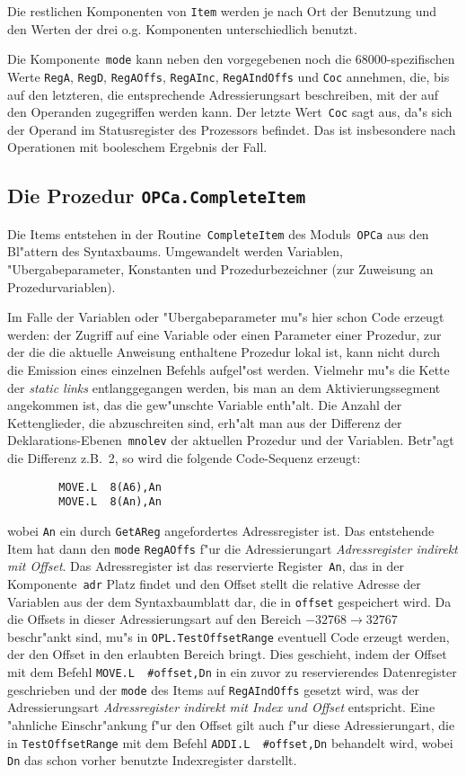 Die restlichen Komponenten von {\tt Item} werden je nach Ort der Benutzung
und den Werten der drei o.g. Komponenten unterschiedlich benutzt.

Die Komponente~{\tt mode} kann neben den vorgegebenen noch die
68000-spezifischen Werte {\tt RegA}, {\tt RegD}, {\tt RegAOffs}, {\tt RegAInc},
{\tt RegAIndOffs} und {\tt Coc} annehmen, die, bis auf den letzteren, die
entsprechende Adressierungsart beschreiben, mit der auf den Operanden
zugegriffen werden kann.
Der letzte Wert~{\tt Coc} sagt aus, da"s sich der Operand im Statusregister
des Prozessors befindet.
Das ist insbesondere nach Operationen mit booleschem Ergebnis der Fall.

\subsection{Die Prozedur {\tt OPCa.CompleteItem}}

Die Items entstehen in der Routine~{\tt CompleteItem} des Moduls~{\tt OPCa}
aus den Bl"attern des Syntaxbaums.
Umgewandelt werden Variablen, "Ubergabeparameter, Konstanten und
Prozedurbezeichner (zur Zuweisung an Prozedurvariablen).

Im Falle der Variablen oder "Ubergabeparameter mu"s hier schon Code
erzeugt werden:
der Zugriff auf eine Variable oder einen Parameter einer Prozedur,
zur der die die aktuelle Anweisung enthaltene Prozedur lokal ist,
kann nicht durch die Emission eines einzelnen Befehls aufgel"ost werden.
Vielmehr mu"s die Kette der {\it static links\/} entlanggegangen werden,
bis man an dem Aktivierungssegment angekommen ist, das die gew"unschte Variable
enth"alt.
Die Anzahl der Kettenglieder, die abzuschreiten sind, erh"alt man aus der
Differenz der Deklarations-Ebenen~{\tt mnolev} der aktuellen Prozedur und der
Variablen.
Betr"agt die Differenz z.B.~2, so wird die folgende Code-Sequenz erzeugt:
\begin{verbatim}
        MOVE.L  8(A6),An
        MOVE.L  8(An),An
\end{verbatim}
wobei {\tt An} ein durch {\tt GetAReg} angefordertes Adressregister ist.
Das entstehende Item hat dann den {\tt mode} {\tt RegAOffs} f"ur
die Adressierungart {\it Adressregister indirekt mit Offset}.
Das Adressregister ist das reservierte Register~{\tt An}, das in der
Komponente~{\tt adr} Platz findet und den Offset stellt die relative
Adresse der Variablen aus der dem Syntaxbaumblatt dar, die in {\tt offset}
gespeichert wird.
Da die Offsets in dieser Adressierungsart auf den Bereich $-32768\to32767$
beschr"ankt sind, mu"s in {\tt OPL.TestOffsetRange} eventuell
Code erzeugt werden, der den Offset in den erlaubten Bereich bringt.
Dies geschieht, indem der Offset mit dem Befehl {\tt MOVE.L\ \ \#offset,Dn}
in ein zuvor zu reservierendes Datenregister geschrieben und der
{\tt mode} des Items auf {\tt RegAIndOffs} gesetzt wird, was
der Adressierungsart {\it Adressregister indirekt mit Index und Offset\/}
entspricht.
Eine "ahnliche Einschr"ankung f"ur den Offset gilt auch f"ur diese Adressierungart,
die in {\tt TestOffsetRange} mit dem Befehl {\tt ADDI.L\ \ \#offset,Dn}
behandelt wird, wobei {\tt Dn} das schon vorher benutzte Indexregister darstellt.

